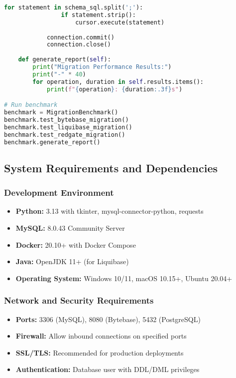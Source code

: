 \begin{lstlisting}[language=Python, caption=Performance Benchmark Script]
            for statement in schema_sql.split(';'):
                if statement.strip():
                    cursor.execute(statement)
            
            connection.commit()
            connection.close()
    
    def generate_report(self):
        print("Migration Performance Results:")
        print("-" * 40)
        for operation, duration in self.results.items():
            print(f"{operation}: {duration:.3f}s")

# Run benchmark
benchmark = MigrationBenchmark()
benchmark.test_bytebase_migration()
benchmark.test_liquibase_migration()
benchmark.test_redgate_migration()
benchmark.generate_report()
\end{lstlisting}

\subsection{System Requirements and Dependencies}

\subsubsection{Development Environment}
\begin{itemize}
    \item \textbf{Python:} 3.13 with tkinter, mysql-connector-python, requests
    \item \textbf{MySQL:} 8.0.43 Community Server
    \item \textbf{Docker:} 20.10+ with Docker Compose
    \item \textbf{Java:} OpenJDK 11+ (for Liquibase)
    \item \textbf{Operating System:} Windows 10/11, macOS 10.15+, Ubuntu 20.04+
\end{itemize}

\subsubsection{Network and Security Requirements}
\begin{itemize}
    \item \textbf{Ports:} 3306 (MySQL), 8080 (Bytebase), 5432 (PostgreSQL)
    \item \textbf{Firewall:} Allow inbound connections on specified ports
    \item \textbf{SSL/TLS:} Recommended for production deployments
    \item \textbf{Authentication:} Database user with DDL/DML privileges
\end{itemize}
